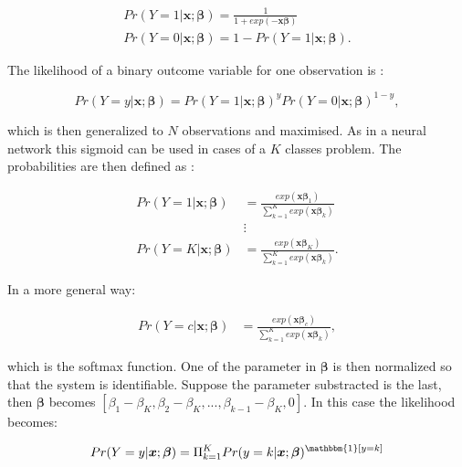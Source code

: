 \documentclass[a4paper,12pt]{article}
\numberwithin{equation}{section}
\begin{document}
\begin{align*}
Pr(Y = 1| \boldsymbol{x};\boldsymbol{\beta}) = \frac{1}{1+exp(-\boldsymbol{x}\boldsymbol{\beta})} \\
Pr(Y = 0| \boldsymbol{x};\boldsymbol{\beta}) = 1 - Pr(Y = 1| \boldsymbol{x};\boldsymbol{\beta}).
\end{align*}

The likelihood of a binary outcome variable for one observation is :

\begin{equation*}
Pr(Y = y| \boldsymbol{x};\boldsymbol{\beta}) = Pr(Y = 1| \boldsymbol{x};\boldsymbol{\beta})^yPr(Y = 0| \boldsymbol{x};\boldsymbol{\beta})^{1-y},
\end{equation*}

which is then generalized to $N$ observations and maximised. As in a neural network this sigmoid can be used in cases of a $K$ classes problem. The probabilities are then defined as :

\begin{align*}
Pr(Y = 1| \boldsymbol{x};\boldsymbol{\beta}) &= \frac{exp(\boldsymbol{x}\boldsymbol{\beta}_1)}{\sum_{k=1}^{K}exp(\boldsymbol{x}\boldsymbol{\beta}_k)} \\
                                             &\vdots \\
Pr(Y = K| \boldsymbol{x};\boldsymbol{\beta}) &= \frac{exp(\boldsymbol{x}\boldsymbol{\beta}_K)}{\sum_{k=1}^{K}exp(\boldsymbol{x}\boldsymbol{\beta}_k)} .
\end{align*}

In a more general way:

\begin{align*}
Pr(Y = c| \boldsymbol{x};\boldsymbol{\beta}) &= \frac{exp(\boldsymbol{x}\boldsymbol{\beta}_c)}{\sum_{k=1}^{K}exp(\boldsymbol{x}\boldsymbol{\beta}_k)} ,
\end{align*}

which is the softmax function. One of the parameter in $\boldsymbol{\beta}$ is then normalized so that the system is identifiable. Suppose the parameter substracted is the last, then $\boldsymbol{\beta}$ becomes $[\beta_1-\beta_K, \beta_2-\beta_K,..., \beta_{k-1}-\beta_K,0]$. In this case the likelihood becomes:

\begin{equation*}
Pr(Y = y| \boldsymbol{x};\boldsymbol{\beta}) = \Pi_{k=1}^{K} Pr(y=k|\boldsymbol{x};\boldsymbol{\beta})^{\mathbbm{1}[y = k]}
\end{equation*}
\end{document}
